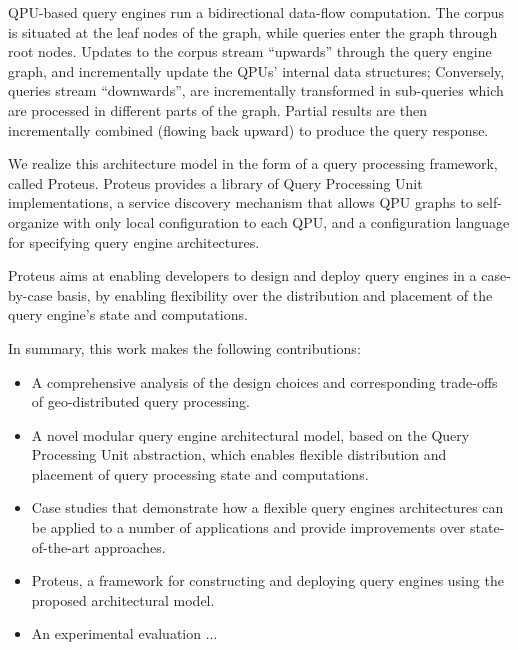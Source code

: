 QPU-based query engines run a bidirectional data-flow computation.
The corpus is situated at the leaf nodes of the graph, while queries enter the graph through root nodes.
Updates to the corpus stream ``upwards'' through the query engine graph, and incrementally update the QPUs’ internal data structures;
Conversely, queries stream ``downwards'', are incrementally transformed in sub-queries which are processed in different parts of the graph.
Partial results are then incrementally combined (flowing back upward) to produce the query response.

\medskip
\noindent
We realize this architecture model in the form of a query processing framework, called Proteus.
Proteus provides a library of Query Processing Unit implementations,
a service discovery mechanism that allows QPU graphs to self-organize with only local configuration to each QPU,
and a configuration language for specifying query engine architectures.

Proteus aims at enabling developers to design and deploy query engines in a case-by-case basis,
by enabling flexibility over the distribution and placement of the query engine's state and computations.


In summary, this work makes the following contributions:

\begin{itemize}
  \item A comprehensive analysis of the design choices and corresponding trade-offs of geo-distributed query processing.

  \item A novel modular query engine architectural model, based on the Query Processing Unit abstraction,
  which enables flexible distribution and placement of query processing state and computations.

  \item Case studies that demonstrate how a flexible query engines architectures can be applied to a number of applications
  and provide improvements over state-of-the-art approaches.

  \item Proteus, a framework for constructing and deploying query engines using the proposed architectural model.

  \item An experimental evaluation ... 
\end{itemize}

